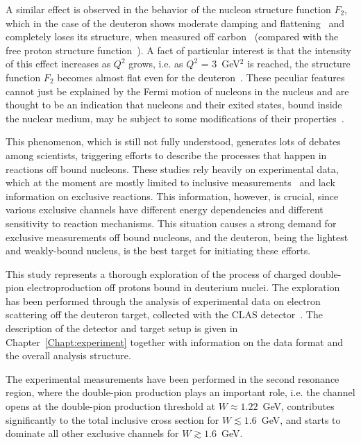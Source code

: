 A similar effect is observed in the behavior of the nucleon structure function $F_{2}$, which in the case of the deuteron shows moderate damping and flattening~\cite{Osipenko:2005gt} and completely loses its structure, when measured off carbon~\cite{Osipenko:2010sb} (compared with the free proton structure function~\cite{Osipenko:2003bu}). A fact of particular interest is that the intensity of this effect increases as $Q^{2}$ grows, i.e. as $Q^{2}$ = 3~GeV$^{2}$ is reached, the structure function $F_{2}$ becomes almost flat even for the deuteron~\cite{Osipenko:2010sb}. These peculiar features cannot just be explained by the Fermi motion of nucleons in the nucleus and are thought to be an indication that nucleons and their exited states, bound inside the nuclear medium, may be subject to some modifications of their properties~\cite{Mokeev:1995fy,Bianchi:1994ax,Ahrens:1986hn,Krusche:2004xz,Noble:1980my}. 



This phenomenon, which is still not fully understood, generates lots of debates among scientists, triggering efforts to describe the processes that happen in reactions off bound nucleons. These studies rely heavily on experimental data, which at the moment are mostly limited to inclusive measurements~\cite{Mokeev:1995fy,Bianchi:1994ax,Ahrens:1986hn,Osipenko_2005_note,Osipenko:2005gt,Osipenko:2010sb} and lack information on exclusive reactions. This information, however, is crucial, since various exclusive channels have different energy dependencies and different sensitivity to reaction mechanisms. This situation causes a strong demand for exclusive measurements off bound nucleons, and the deuteron, being the lightest and weakly-bound nucleus, is the best target for initiating these efforts.


This study represents a thorough exploration of the process of charged double-pion electroproduction off protons bound in deuterium nuclei. The exploration has been performed through the analysis of experimental data on electron scattering off the deuteron target, collected with the CLAS detector~\cite{Mecking:2003zu}. The description of the detector and target setup is given in Chapter~\ref{Chapt:experiment} together with information on the data format and the overall analysis structure. 

The experimental measurements have been performed in the second resonance region, where the double-pion production plays an important role, i.e. the channel opens at the double-pion production threshold at $W \approx 1.22$~GeV, contributes significantly to the total inclusive cross section for $W \lesssim 1.6$~GeV, and starts to dominate all other exclusive channels for $W \gtrsim 1.6$~GeV.


